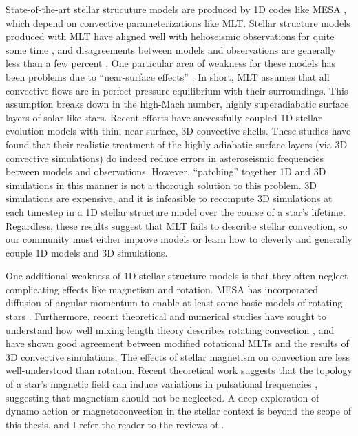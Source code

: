 State-of-the-art stellar strucuture models are produced by 1D codes like MESA \citep{paxton&all2011}, which depend on convective parameterizations like MLT.
Stellar structure models produced with MLT have aligned well with helioseismic observations for quite some time \citep{christensen-dalsgaard&all1996}, and disagreements between models and observations are generally less than a few percent \citep{serenelli&all2009}.
One particular area of weakness for these models has been problems due to ``near-surface effects'' \citep{kjeldsen&all2008}.
In short, MLT assumes that all convective flows are in perfect pressure equilibrium with their surroundings.
This assumption breaks down in the high-Mach number, highly superadiabatic surface layers of solar-like stars.
Recent efforts \citep{jorgensen&weiss2019, mosumgaard&all2020} have successfully coupled 1D stellar evolution models with thin, near-surface, 3D convective shells.
These studies have found that their realistic treatment of the highly adiabatic surface layers (via 3D convective simulations) do indeed reduce errors in asteroseismic frequencies between models and observations.
However, ``patching'' together 1D and 3D simulations in this manner is not a thorough solution to this problem.
3D simulations are expensive, and it is infeasible to recompute 3D simulations at each timestep in a 1D stellar structure model over the course of a star's lifetime.
Regardless, these results suggest that MLT fails to describe stellar convection, so our community must either improve models or learn how to cleverly and generally couple 1D models and 3D simulations.

One additional weakness of 1D stellar structure models is that they often neglect complicating effects like magnetism and rotation.
MESA has incorporated diffusion of angular momentum to enable at least some basic models of rotating stars \citep{paxton&all2013}.
Furthermore, recent theoretical and numerical studies have sought to understand how well mixing length theory describes rotating convection \citep{BDLithwick2014, currie&all2020}, and have shown good agreement between modified rotational MLTs and the results of 3D convective simulations.
The effects of stellar magnetism on convection are less well-understood than rotation.
Recent theoretical work suggests that the topology of a star's magnetic field can induce variations in pulsational frequencies \citep{santos&all2018}, suggesting that magnetism should not be neglected.
A deep exploration of dynamo action or magnetoconvection in the stellar context is beyond the scope of this thesis, and I refer the reader to the reviews of \citet{brandenburg&subramian2005, charbonneau2010, charbonneau2014, brun&browning2017}.


